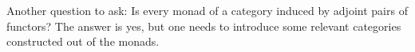 \documentclass{article}
\begin{document}

\hfil

Another question to ask: Is every monad of a category induced by adjoint pairs of functors? The answer is yes, but one needs to introduce some relevant categories constructed out of the monads.
\end{document}
